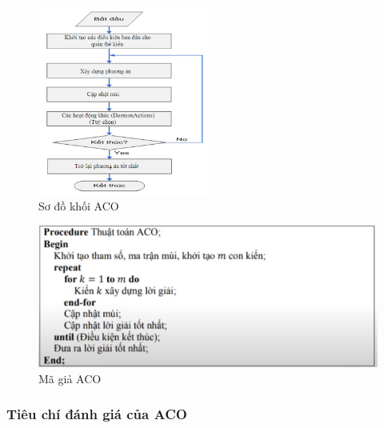 \documentclass[14pt]{article}
\begin{document}
		\begin{figure}[htbp]
		\centering
		\includegraphics[width=0.5\textwidth]{./Image/Sơ đồ khối ACO.png}
		\caption{Sơ đồ khối ACO}
		\label{fig:mylabel}
	\end{figure}

	\begin{figure}[htbp]
		\centering
		\includegraphics[width=\textwidth]{./Image/Mã giả ACO.png}
		\caption{Mã giả ACO}
		\label{fig:mylabel}
	\end{figure}	
	\newpage
	\subsubsection{Tiêu chí đánh giá của ACO}
	
\end{document}
